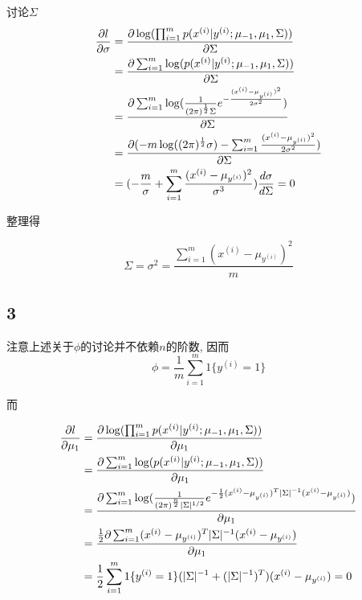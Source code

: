 \documentclass{ctexart}
\begin{document}
讨论$\Sigma$
\begin{align*}
\frac{\partial l}{\partial \sigma} &= \frac{\partial \log(\prod_{i=1}^m p(x^{(i)}|y^{(i)};\mu_{-1},\mu_1,\Sigma))}{\partial \Sigma} \notag \\
&=  \frac{\partial \sum_{i=1}^m\log( p(x^{(i)}|y^{(i)};\mu_{-1},\mu_1,\Sigma))}{\partial \Sigma} \notag \\
&=  \frac{\partial \sum_{i=1}^m\log(\frac{1}{(2\pi)^{\frac{1}{2}}\Sigma}e^{-\frac{(x^{(i)}-\mu_{y^{(i)}})^2}{2\sigma^2}})}{\partial \Sigma} \notag \\
&=  \frac{ \partial (-m\log((2\pi)^{\frac{1}{2}}\sigma) -\sum_{i=1}^m \frac{(x^{(i)} - \mu_{y^{(i)}})^2}{2 \sigma^2})}{\partial \Sigma} \notag \\
&= (-\frac{m}{\sigma} + \sum_{i=1}^m\frac{(x^{(i)} -\mu_{y^{(i)}})^2}{\sigma^3})\frac{d \sigma}{d \Sigma} = 0
\end{align*}

整理得

\begin{equation}
	\Sigma = \sigma^2 = \frac{\sum_{i=1}^m(x^{(i)} - \mu_{y^{(i)}})^2}{m}
\end{equation}

\subsection{3}

注意上述关于$\phi$的讨论并不依赖$n$的阶数, 因而
\begin{equation}
\phi = \frac{1}{m} \sum_{i=1}^m 1\{y^{(i)} = 1\}
\end{equation}

而

\begin{align*}
\frac{\partial l}{\partial \mu_1} &= \frac{\partial \log(\prod_{i=1}^m p(x^{(i)}|y^{(i)};\mu_{-1},\mu_1,\Sigma))}{\partial \mu_1} \notag \\
&=  \frac{\partial \sum_{i=1}^m\log( p(x^{(i)}|y^{(i)};\mu_{-1},\mu_1,\Sigma))}{\partial \mu_1} \notag \\
&=  \frac{\partial \sum_{i=1}^m\log(\frac{1}{(2\pi)^{\frac{n}{2}}|\Sigma|^{1/2}}e^{-\frac{1}{2}(x^{(i)}-\mu_{y^{(i)}})^T |\Sigma|^{-1} (x^{(i)}-\mu_{y^{(i)}})})}{\partial \mu_1} \notag \\
&=  \frac{\frac{1}{2}\partial \sum_{i=1}^m (x^{(i)}-\mu_{y^{(i)}})^T |\Sigma|^{-1} (x^{(i)}-\mu_{y^{(i)}})}{\partial \mu_1} \notag \\
&= \frac{1}{2}\sum_{i=1}^m 1\{y^{(i)} = 1\}(|\Sigma|^{-1} + (|\Sigma|^{-1})^T)(x^{(i)} - \mu_{y^{(i)}}) = 0
\end{align*}
\end{document}
